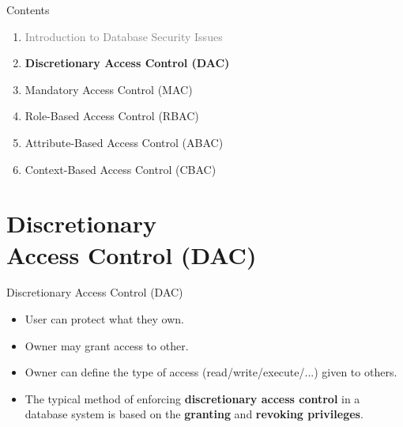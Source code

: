 
\begin{frame}{Contents}
    \Large
    \vspace{-0.5cm} 
    
    \begin{enumerate}
        \setlength{\itemsep}{0.4cm} 
        
        \item \textcolor{gray}{Introduction to Database Security Issues}
        
        \item \textbf{Discretionary Access Control (DAC)}
        
        \item Mandatory Access Control (MAC)
        \item Role-Based Access Control (RBAC)
        \item Attribute-Based Access Control (ABAC)
        \item Context-Based Access Control (CBAC)
        
    \end{enumerate}
\end{frame}

\section{Discretionary \\ Access Control (DAC)}


\begin{frame}{Discretionary Access Control (DAC)}
    \Large %
    
    \begin{itemize}
        \vspace{-1.5cm} %
        
        \item User can protect what they own.
        \item Owner may grant access to other.
        \item Owner can define the type of access (read/write/execute/...) given to others.
        
        \vspace{0.6cm} %
        
        \item The typical method of enforcing \textbf{discretionary access control} in a database system is based on the \textbf{granting} and \textbf{revoking privileges}.
        
    \end{itemize}
\end{frame}


